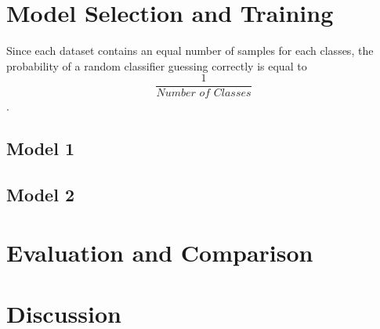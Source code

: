 \documentclass[12pt]{article}
\begin{document}
\section{Model Selection and Training}

Since each dataset contains an equal number of samples for each classes, the probability of a random classifier guessing correctly is equal to $$\frac{1}{\textit{Number of Classes}}$$. 

\subsection{Model 1}
\subsection{Model 2}
\section{Evaluation and Comparison}
\section{Discussion}



\end{document}
